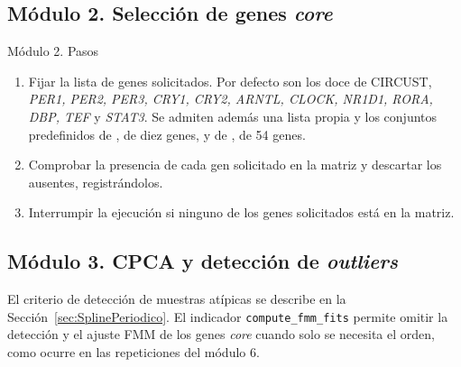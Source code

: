 \documentclass[12pt, a4paper]{report}
\newcommand{\nuevo}[1]{\textcolor{cnuevo}{#1}}
\newenvironment{pasos}{\begin{enumerate}[nosep,leftmargin=1.5em,label=\arabic*.]}{\end{enumerate}}
\begin{document}
\subsection{Módulo 2. Selección de genes \textit{core}}

\begin{panel}{Módulo 2. Pasos}
\begin{pasos}
\item Fijar la lista de genes solicitados. Por defecto son los doce de CIRCUST, \textit{PER1, PER2, PER3, CRY1, CRY2, ARNTL, CLOCK, NR1D1, RORA, DBP, TEF} y \textit{STAT3}. \nuevo{Se admiten además una lista propia y los conjuntos predefinidos de \citet{zhang2014}, de diez genes, y de \citet{ruben2018}, de 54 genes.}
\item \nuevo{Comprobar la presencia de cada gen solicitado en la matriz y descartar los ausentes, registrándolos.}
\item \nuevo{Interrumpir la ejecución si ninguno de los genes solicitados está en la matriz.}
\end{pasos}
\end{panel}

\subsection{Módulo 3. CPCA y detección de \textit{outliers}}

El criterio de detección de muestras atípicas se describe en la Sección~\ref{sec:SplinePeriodico}. El indicador \texttt{compute\_fmm\_fits} permite omitir la detección y el ajuste FMM de los genes \textit{core} cuando solo se necesita el orden, como ocurre en las repeticiones del módulo 6.
\end{document}
